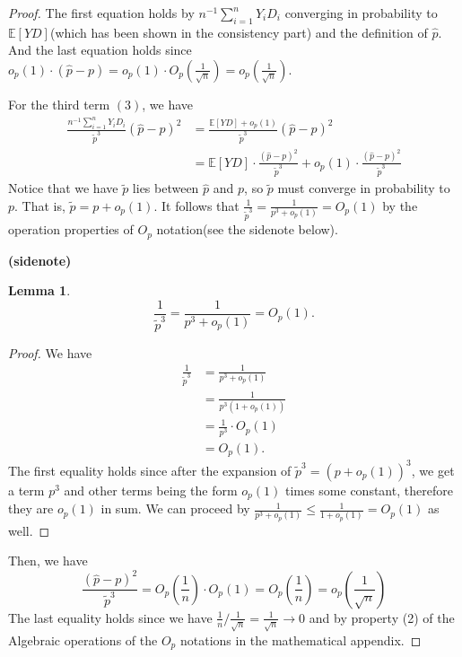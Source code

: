 \documentclass[11pt,a4paper]{amsart}
\theoremstyle{plain}
\newtheorem{lemma}{Lemma}
\theoremstyle{definition}
\begin{document}
\begin{proof}
	 The first equation holds by $n^{-1}\sum_{i = 1}^{n}Y_{i}D_{i}$ converging in probability to $\mathbb{E}[YD]$(which has been shown in the consistency part) and the definition of $\hat{p}$. And the last equation holds since $o_{p}(1)\cdot(\hat{p} - p) = o_{p}(1)\cdot O_{p}(\frac{1}{\sqrt{n}}) = o_{p}(\frac{1}{\sqrt{n}})$.\par 
	 For the third term $(3)$, we have 
	 \[	\begin{aligned}
			\frac{n^{-1}\sum_{i = 1}^{n}Y_{i}D_{i}}{\tilde{p}^{3}} (\hat{p} - p)^{2} &= \frac{\mathbb{E}[YD]+o_{p}(1)}{\tilde{p}^{3}} (\hat{p} - p)^{2}\\
			&= \mathbb{E}[YD]\cdot\frac{(\hat{p} - p)^{2}}{\tilde{p}^{3}}  + o_{p}(1) \cdot \frac{(\hat{p} - p)^{2}}{\tilde{p}^{3}} 
	 \end{aligned}	\]
	 Notice that we have $\tilde{p}$ lies between $\hat{p}$ and $p$, so $\tilde{p}$ must converge in probability to $p$. That is, $\tilde{p} = p + o_{p}(1)$. It follows that $\frac{1}{\tilde{p}^{3}} = \frac{1}{p^{3} + o_{p}(1)} = O_{p}(1)$ by the operation properties of $O_{p}$ notation(see the sidenote below).
	 \begin{framed}
	 	\textbf{(sidenote)} 
	 	\begin{lemma}
	 	\[	\frac{1}{\tilde{p}^{3}} = \frac{1}{p^{3} + o_{p}(1)} = O_{p}(1).	\]
	 	\end{lemma}
 		\begin{proof}
 			We have 
 			\[	\begin{aligned}
 			\frac{1}{\tilde{p}^{3}} &= \frac{1}{p^{3} + o_{p}(1)}	\\
 			&= \frac{1}{p^{3}(1 + o_{p}(1))}	\\
 			&= \frac{1}{p^{3}} \cdot O_{p}(1)	\\
 			&= O_{p}(1).
 			\end{aligned}
 				\]
 				The first equality holds since after the expansion of $\tilde{p}^{3} = (p + o_{p}(1))^{3}$, we get a term $p^{3}$ and other terms being the form $o_{p}(1)$ times some constant, therefore they are $o_{p}(1)$ in sum. We can proceed by $ \frac{1}{p^{3} + o_{p}(1)} \leq  \frac{1}{1 + o_{p}(1)} = O_{p}(1)$ as well.
 		\end{proof}
	 \end{framed}
	  Then, we have
	 \[		\frac{(\hat{p} - p)^{2}}{\tilde{p}^{3}} = O_{p}(\frac{1}{n})\cdot O_{p}(1) = O_{p}(\frac{1}{n}) = o_{p}(\frac{1}{\sqrt{n}})	\]
	 The last equality holds since we have $\frac{1}{n}/\frac{1}{\sqrt{n}} = \frac{1}{\sqrt{n}} \rightarrow 0$ and by property (2) of the Algebraic operations of the $O_{p}$ notations in the mathematical appendix.\par 

\end{proof}
\end{document}
